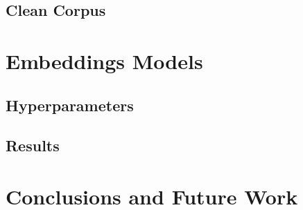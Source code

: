 \documentclass{article}
\begin{document}
\subsection{Clean Corpus}

\section{Embeddings Models}\label{sec:models}

\subsection{Hyperparameters}

\subsection{Results}

\section{Conclusions and Future Work}\label{sec:conclusions}






\end{document}
